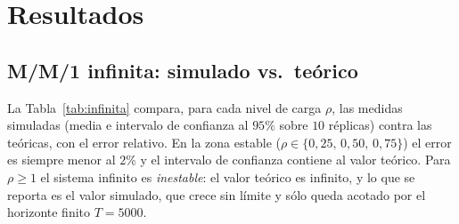 \documentclass[11pt]{article}
\begin{document}
\section{Resultados}

\subsection{M/M/1 infinita: simulado vs.\ te\'orico}

La Tabla~\ref{tab:infinita} compara, para cada nivel de carga $\rho$, las
medidas simuladas (media e intervalo de confianza al $95\%$ sobre $10$
r\'eplicas) contra las te\'oricas, con el error relativo. En la zona estable
($\rho \in \{0{,}25,\,0{,}50,\,0{,}75\}$) el error es siempre menor al $2\%$
y el intervalo de confianza contiene al valor te\'orico. Para
$\rho \ge 1$ el sistema infinito es \emph{inestable}: el valor te\'orico es
infinito, y lo que se reporta es el valor simulado, que crece sin l\'imite y
s\'olo queda acotado por el horizonte finito $T = 5000$.
\end{document}

